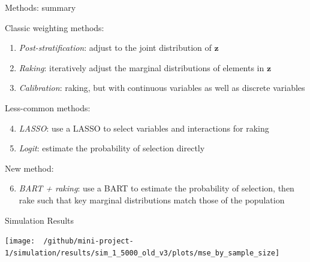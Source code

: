 \documentclass[
  ignorenonframetext,
]{beamer}
\providecommand{\tightlist}{%
  \setlength{\itemsep}{0pt}\setlength{\parskip}{0pt}}
\begin{document}
\begin{frame}{Methods: summary}
\protect\hypertarget{methods-summary}{}

Classic weighting methods:

\begin{enumerate}
\tightlist
\item
  \emph{Post-stratification}: adjust to the joint distribution of
  \(\mathbf{z}\)
\item
  \emph{Raking}: iteratively adjust the marginal distributions of
  elements in \(\mathbf{z}\)
\item
  \emph{Calibration}: raking, but with continuous variables as well as
  discrete variables
\end{enumerate}

Less-common methods:

\begin{enumerate}
\setcounter{enumi}{3}
\tightlist
\item
  \emph{LASSO}: use a LASSO to select variables and interactions for
  raking
\item
  \emph{Logit}: estimate the probability of selection directly
\end{enumerate}

New method:

\begin{enumerate}
\setcounter{enumi}{5}
\tightlist
\item
  \emph{BART + raking}: use a BART to estimate the probability of
  selection, then rake such that key marginal distributions match those
  of the population
\end{enumerate}

\end{frame}

\begin{frame}{Simulation Results}
\protect\hypertarget{simulation-results}{}

\center

\texttt{[image: ~/github/mini-project-1/simulation/results/sim\_1\_5000\_old\_v3/plots/mse\_by\_sample\_size]}

\end{frame}
\end{document}

